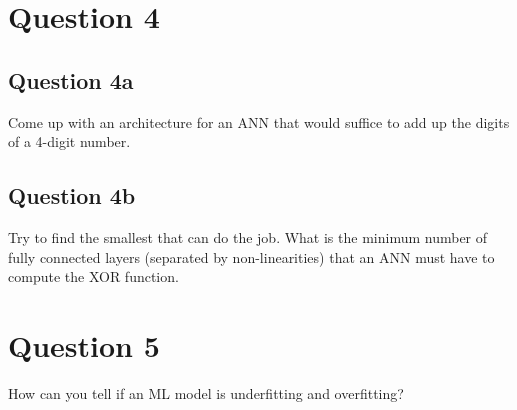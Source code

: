 \documentclass{kthreport}
\begin{document}
\section{Question 4}
\subsection{Question 4a}
Come up with an architecture for an ANN that would suffice to add up the digits of a 4-digit number.

\subsection{Question 4b}
Try to find the smallest that can do the job.  
What is the minimum number of fully connected layers (separated by non-linearities) 
that an ANN must have to compute the XOR function.

\section{Question 5}
How can you tell if an ML model is underfitting and overfitting?
\end{document}
